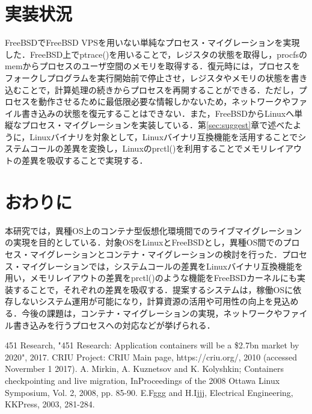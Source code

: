 \documentclass[11pt]{jarticle}
\begin{document}
\section{実装状況}
FreeBSDでFreeBSD VPSを用いない単純なプロセス・マイグレーションを実現した．FreeBSD上でptrace()を用いることで，レジスタの状態を取得し，procfsのmemからプロセスのユーザ空間のメモリを取得する．復元時には，プロセスをフォークしプログラムを実行開始前で停止させ，レジスタやメモリの状態を書き込むことで，計算処理の続きからプロセスを再開することができる．ただし，プロセスを動作させるために最低限必要な情報しかないため，ネットワークやファイル書き込みの状態を復元することはできない．また，FreeBSDからLinuxへ単縦なプロセス・マイグレーションを実装している．第\ref{sec:suggest}章で述べたように，Linuxバイナリを対象として，Linuxバイナリ互換機能を活用することでシステムコールの差異を変換し，Linuxのprctl()を利用することでメモリレイアウトの差異を吸収することで実現する．

\section{おわりに}
本研究では，異種OS上のコンテナ型仮想化環境間でのライブマイグレーションの実現を目的としている．対象OSをLinuxとFreeBSDとし，異種OS間でのプロセス・マイグレーションとコンテナ・マイグレーションの検討を行った．プロセス・マイグレーションでは，システムコールの差異をLinuxバイナリ互換機能を用い，メモリレイアウトの差異をprctl()のような機能をFreeBSDカーネルにも実装することで，それぞれの差異を吸収する．提案するシステムは，稼働OSに依存しないシステム運用が可能になり，計算資源の活用や可用性の向上を見込める．今後の課題は，コンテナ・マイグレーションの実現，ネットワークやファイル書き込みを行うプロセスへの対応などが挙げられる．



\begin{thebibliography}{99}
	451 Research, "451 Research: Application containers will be a \$2.7bn market by 2020", 2017.
	CRIU Project: CRIU Main page, https://criu.org/, 2010 (accessed Novermber 1 2017).
	A. Mirkin, A. Kuznetsov and K. Kolyshkin; Containers checkpointing and live migration, InProceedings of the 2008 Ottawa Linux Symposium, Vol. 2, 2008, pp. 85-90.
	E.Fggg and H.Ijjj, Electrical Engineering, KKPress, 2003, 281-284.
\end{thebibliography}
\end{document}
